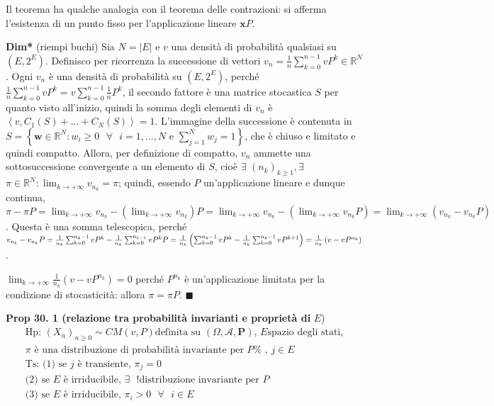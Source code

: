 \documentclass{article}
\begin{document}
Il teorema ha qualche analogia con il teorema delle contrazioni: si afferma
l'esistenza di un punto fisso per l'applicazione lineare $\mathbf{x}P$.

\textbf{Dim*} (riempi buchi) Sia $N=\left\vert E\right\vert $ e $v$ una
densit\`{a} di probabilit\`{a} qualsiasi su $\left( E,2^{E}\right) $.
Definisco per ricorrenza la successione di vettori $v_{n}=\frac{1}{n}%
\sum_{k=0}^{n-1}vP^{k}\in 
\mathbb{R}
^{N}$. Ogni $v_{n}$ \`{e} una densit\`{a} di probabilit\`{a} su $\left(
E,2^{E}\right) $, perch\'{e} $\frac{1}{n}\sum_{k=0}^{n-1}vP^{k}=v%
\sum_{k=0}^{n-1}\frac{1}{n}P^{k}$, il secondo fattore \`{e} una matrice
stocastica $S$ per quanto visto all'inizio, quindi la somma degli elementi
di $v_{n}$ \`{e} $\left\langle v,C_{1}\left( S\right) +...+C_{N}\left(
S\right) \right\rangle =1$. L'immagine della successione \`{e} contenuta in $%
S=\left\{ \mathbf{w}\in 
\mathbb{R}
^{N}:w_{i}\geq 0\text{ }\forall \text{ }i=1,...,N\text{ e }%
\sum_{j=1}^{N}w_{j}=1\right\} $, che \`{e} chiuso e limitato e quindi
compatto. Allora, per definizione di compatto, $v_{n}$ ammette una
sottosuccessione convergente a un elemento di $S$, cio\`{e} $\exists $ $%
\left( n_{k}\right) _{k\geq 1},\exists $ $\pi \in 
\mathbb{R}
^{N}:\lim_{k\rightarrow +\infty }v_{n_{k}}=\pi $; quindi, essendo $P$
un'applicazione lineare e dunque continua, $\pi -\pi P=\lim_{k\rightarrow
+\infty }v_{n_{k}}-\left( \lim_{k\rightarrow +\infty }v_{n_{k}}\right)
P=\lim_{k\rightarrow +\infty }v_{n_{k}}-\left( \lim_{k\rightarrow +\infty
}v_{n_{k}}P\right) =\lim_{k\rightarrow +\infty }\left(
v_{n_{k}}-v_{n_{k}}P\right) $. Questa \`{e} una somma telescopica, perch\'{e}
$v_{n_{k}}-v_{n_{k}}P=\frac{1}{n_{k}}\sum_{k=0}^{n_{k}-1}vP^{k}-\frac{1}{%
n_{k}}\sum_{k=0}^{n_{k-1}}vP^{k}P=\frac{1}{n_{k}}\left(
\sum_{k=0}^{n_{k}-1}vP^{k}-\frac{1}{n_{k}}\sum_{k=0}^{n_{k}-1}vP^{k+1}%
\right) =\frac{1}{n_{k}}\left( v-vP^{n_{k}}\right) $.

$\lim_{k\rightarrow +\infty }\frac{1}{n_{k}}\left( v-vP^{n_{k}}\right) =0$
perch\'{e} $P^{n_{k}}$ \`{e} un'applicazione limitata per la condizione di
stocasticit\`{a}: allora $\pi =\pi P$. $\blacksquare $

\textbf{Prop 30. 1 (relazione tra probabilit\`{a} invarianti e propriet\`{a}
di }$E$)%
\begin{gather*}
\text{Hp: }\left( X_{n}\right) _{n\geq 0}\sim CM\left( v,P\right) \text{
definita su }\left( \Omega ,\mathcal{A},\mathbf{P}\right) \text{, }E\text{
spazio degli stati,} \\
\pi \text{ \`{e} una distribuzione di probabilit\`{a} invariante per }P\text{%
, }j\in E \\
\text{Ts: (1) se }j\text{ \`{e} transiente, }\pi _{j}=0 \\
\text{(2) se }E\text{ \`{e} irriducibile, }\exists \text{ }!\text{
distribuzione invariante per }P \\
\text{(3) se }E\text{ \`{e} irriducibile, }\pi _{i}>0\text{ }\forall \text{ }%
i\in E
\end{gather*}
\end{document}
